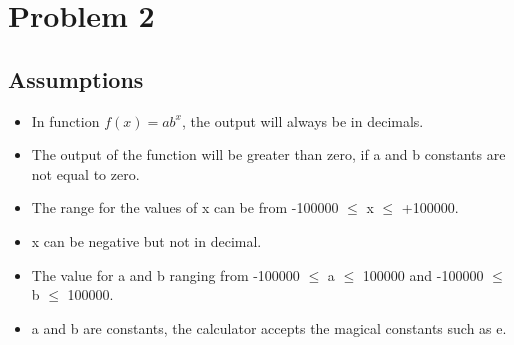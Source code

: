 \documentclass[a4paper,12pt]{article}
\begin{document}
\section{Problem 2}
    \subsection{Assumptions}
        \begin{itemize}
            \item In function $f(x) = ab^x$, the output will always be in decimals.
            \item The output of the function will be greater than zero, if a and b constants are not equal to zero.
            \item The range for the values of x can be from -100000 $\leq$ x $\leq$ +100000.
            \item x can be negative but not in decimal.
            \item The value for a and b ranging from  -100000 $\leq$ a $\leq$ 100000 and -100000 $\leq$ b $\leq$ 100000.
            \item a and b are constants, the calculator accepts the magical constants such as e.
        \end{itemize}
\end{document}
